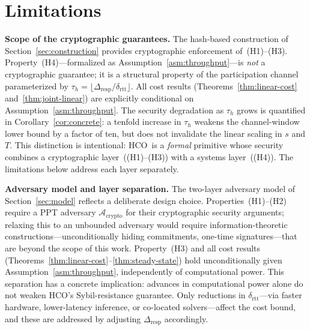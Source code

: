 \documentclass[11pt]{article}
\newcommand{\HCO}{HCO\xspace}
\theoremstyle{remark}
\theoremstyle{plain}
\begin{document}
	
	\section{Limitations}
	\label{sec:limitations}
	
	\noindent\textbf{Scope of the cryptographic guarantees.}
	The hash-based construction of Section~\ref{sec:construction}
	provides cryptographic enforcement of~(H1)--(H3).
	Property~(H4)---formalized as Assumption~\ref{asm:throughput}---is
	\emph{not} a cryptographic guarantee; it is a structural property of
	the participation channel parameterized by
	$\tau_h = \lfloor\Delta_{\mathrm{resp}}/\delta_{\mathrm{rtt}}\rfloor$.
	All cost results (Theorems~\ref{thm:linear-cost}
	and~\ref{thm:joint-linear}) are explicitly conditional on
	Assumption~\ref{asm:throughput}. The security degradation as $\tau_h$
	grows is quantified in Corollary~\ref{cor:concrete}: a tenfold
	increase in $\tau_h$ weakens the channel-window lower bound by a
	factor of ten, but does not invalidate the linear scaling in $s$
	and $T$. This distinction is intentional: \HCO\ is a \emph{formal}
	primitive whose security combines a cryptographic
	layer~((H1)--(H3)) with a systems layer~((H4)). The limitations
	below address each layer separately.
	
	\noindent\textbf{Adversary model and layer separation.}
	The two-layer adversary model of Section~\ref{sec:model} reflects
	a deliberate design choice. Properties~(H1)--(H2) require a PPT
	adversary $\mathcal{A}_{\mathrm{crypto}}$ for their cryptographic
	security arguments; relaxing this to an unbounded adversary would
	require information-theoretic constructions---unconditionally hiding
	commitments, one-time signatures---that are beyond the scope of
	this work. Property~(H3) and all cost results
	(Theorems~\ref{thm:linear-cost}--\ref{thm:steady-state}) hold
	unconditionally given Assumption~\ref{asm:throughput}, independently
	of computational power. This separation has a concrete implication:
	advances in computational power alone do not weaken \HCO's
	Sybil-resistance guarantee. Only reductions in
	$\delta_{\mathrm{rtt}}$---via faster hardware, lower-latency
	inference, or co-located solvers---affect the cost bound, and
	these are addressed by adjusting $\Delta_{\mathrm{resp}}$
	accordingly.
	
\end{document}
